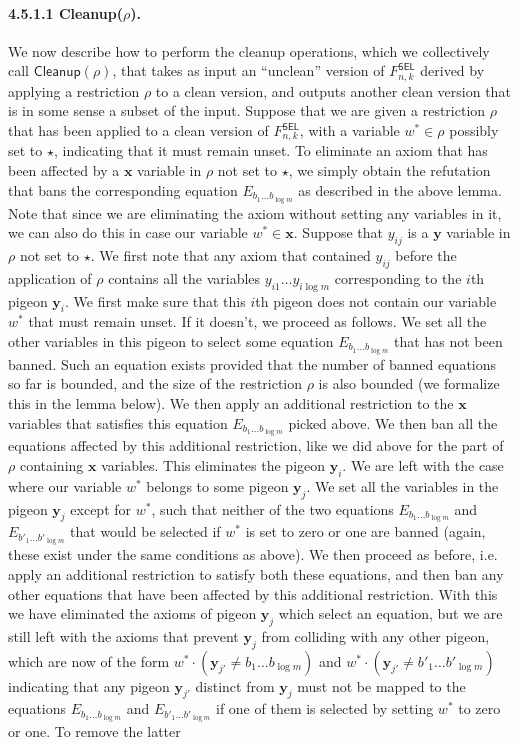 \paragraph{4.5.1.1 Cleanup($\rho$).}
We now describe how to perform the cleanup operations, which we collectively call $\mathsf{Cleanup}(\rho)$, that takes as input an ``unclean'' version of $F^{\mathsf{SEL}}_{n,k}$ derived by applying a restriction $\rho$ to a clean version, and outputs another clean version that is in some sense a subset of the input. Suppose that we are given a restriction $\rho$ that has been applied to a clean version of $F^{\mathsf{SEL}}_{n,k}$, with a variable $w^*\in\rho$ possibly set to $\star$, indicating that it must remain unset. To eliminate an axiom that has been affected by a $\mathbf x$ variable in $\rho$ not set to $\star$, we simply obtain the refutation that bans the corresponding equation $E_{b_1\ldots b_{\log m}}$ as described in the above lemma. Note that since we are eliminating the axiom without setting any variables in it, we can also do this in case our variable $w^*\in\mathbf x$. Suppose that $y_{ij}$ is a $\mathbf y$ variable in $\rho$ not set to $\star$. We first note that any axiom that contained $y_{ij}$ before the application of $\rho$ contains all the variables $y_{i1}\ldots y_{i\log m}$ corresponding to the $i$th pigeon $\mathbf y_i$. We first make sure that this $i$th pigeon does not contain our variable $w^*$ that must remain unset. If it doesn't, we proceed as follows. We set all the other variables in this pigeon to select some equation $E_{b_1\ldots b_{\log m}}$ that has not been banned. Such an equation exists provided that the number of banned equations so far is bounded, and the size of the restriction $\rho$ is also bounded (we formalize this in the lemma below). We then apply an additional restriction to the $\mathbf x$ variables that satisfies this equation $E_{b_1\ldots b_{\log m}}$ picked above. We then ban all the equations affected by this additional restriction, like we did above for the part of $\rho$ containing $\mathbf x$ variables. This eliminates the pigeon $\mathbf y_i$. We are left with the case where our variable $w^*$ belongs to some pigeon $\mathbf y_j$. We set all the variables in the pigeon $\mathbf y_j$ except for $w^*$, such that neither of the two equations $E_{b_1\ldots b_{\log m}}$ and $E_{b'_1\ldots b'_{\log m}}$ that would be selected if $w^*$ is set to zero or one are banned (again, these exist under the same conditions as above). We then proceed as before, i.e. apply an additional restriction to satisfy both these equations, and then ban any other equations that have been affected by this additional restriction. With this we have eliminated the axioms of pigeon $\mathbf y_j$ which select an equation, but we are still left with the axioms that prevent $\mathbf y_j$ from colliding with any other pigeon, which are now of the form $w^*\cdot(\mathbf y_{j'}\neq b_1\ldots b_{\log m})$ and $w^*\cdot(\mathbf y_{j'}\neq b'_1\ldots b'_{\log m})$ indicating that any pigeon $\mathbf y_{j'}$ distinct from $\mathbf y_j$ must not be mapped to the equations $E_{b_1\ldots b_{\log m}}$ and $E_{b'_1\ldots b'_{\log m}}$ if one of them is selected by setting $w^*$ to zero or one. To remove the latter 